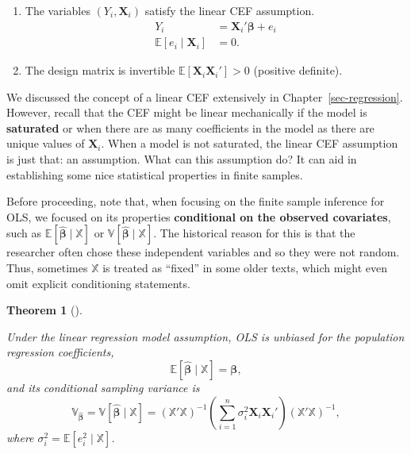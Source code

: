 \documentclass[
  letterpaper,
  DIV=11,
  numbers=noendperiod]{scrreprt}
\newcommand{\mb}{\symbf}
\newcommand{\E}{\mathbb{E}}
\newcommand{\V}{\mathbb{V}}
\newcommand{\X}{\mb{X}}
\newcommand{\Xmat}{\mathbb{X}}
\newcommand{\bfbeta}{\mb{\beta}}
\newcommand{\bhat}{\widehat{\mb{\beta}}}
\theoremstyle{plain}
\newtheorem{theorem}{Theorem}[chapter]
\theoremstyle{definition}
\theoremstyle{definition}
\theoremstyle{remark}
\begin{document}
\begin{tcolorbox}[enhanced jigsaw, opacityback=0, breakable, bottomtitle=1mm, opacitybacktitle=0.6, coltitle=black, leftrule=.75mm, toptitle=1mm, colback=white, titlerule=0mm, colframe=quarto-callout-note-color-frame, rightrule=.15mm, bottomrule=.15mm, toprule=.15mm, title=\textcolor{quarto-callout-note-color}{\faInfo}\hspace{0.5em}{Assumption: Linear Regression Model}, left=2mm, arc=.35mm, colbacktitle=quarto-callout-note-color!10!white]

\begin{enumerate}
\def\labelenumi{\arabic{enumi}.}
\item
  The variables \((Y_{i}, \X_{i})\) satisfy the linear CEF assumption.
  \[ 
  \begin{aligned}
    Y_{i} &= \X_{i}'\bfbeta + e_{i} \\
    \E[e_{i}\mid \X_{i}] & = 0.
  \end{aligned}
  \]
\item
  The design matrix is invertible \(\E[\X_{i}\X_{i}'] > 0\) (positive
  definite).
\end{enumerate}

\end{tcolorbox}

We discussed the concept of a linear CEF extensively in
Chapter~\ref{sec-regression}. However, recall that the CEF might be
linear mechanically if the model is \textbf{saturated} or when there are
as many coefficients in the model as there are unique values of
\(\X_i\). When a model is not saturated, the linear CEF assumption is
just that: an assumption. What can this assumption do? It can aid in
establishing some nice statistical properties in finite samples.

Before proceeding, note that, when focusing on the finite sample
inference for OLS, we focused on its properties \textbf{conditional on
the observed covariates}, such as \(\E[\bhat \mid \Xmat]\) or
\(\V[\bhat \mid \Xmat]\). The historical reason for this is that the
researcher often chose these independent variables and so they were not
random. Thus, sometimes \(\Xmat\) is treated as ``fixed'' in some older
texts, which might even omit explicit conditioning statements.

\begin{theorem}[]\protect\hypertarget{thm-ols-unbiased}{}\label{thm-ols-unbiased}

Under the linear regression model assumption, OLS is unbiased for the
population regression coefficients, \[
\E[\bhat \mid \Xmat] = \bfbeta,
\] and its conditional sampling variance is \[
\mb{\V}_{\bhat} = \V[\bhat \mid \Xmat] = \left( \Xmat'\Xmat \right)^{-1}\left( \sum_{i=1}^n \sigma^2_i \X_i\X_i' \right) \left( \Xmat'\Xmat \right)^{-1},
\] where \(\sigma^2_{i} = \E[e_{i}^{2} \mid \Xmat]\).

\end{theorem}
\end{document}
